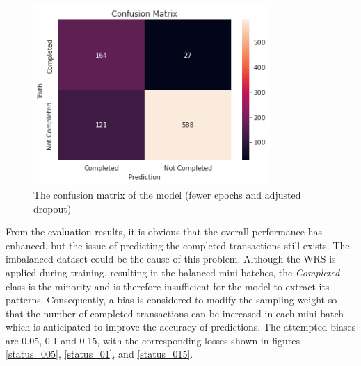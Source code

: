 \documentclass[12pt,twoside]{report}
\begin{document}
\begin{figure}[!htbp]
	\centering
	\includegraphics[width=9cm]{cm_fewer}
	\caption{The confusion matrix of the model (fewer epochs and adjusted dropout)}
	\label{status_fewer_prediction}
\end{figure}

From the evaluation results, it is obvious that the overall performance has enhanced, but the issue of predicting the completed transactions still exists. The imbalanced dataset could be the cause of this problem. Although the WRS is applied during training, resulting in the balanced mini-batches, the \textit{Completed} class is the minority and is therefore insufficient for the model to extract its patterns. Consequently, a bias is considered to modify the sampling weight so that the number of completed transactions can be increased in each mini-batch which is anticipated to improve the accuracy of predictions. The attempted biases are 0.05, 0.1 and 0.15, with the corresponding losses shown in figures \ref{status_005}, \ref{status_01}, and \ref{status_015}. 
\end{document}
